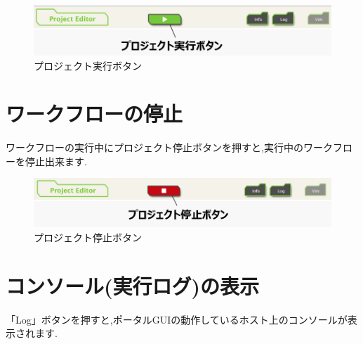 \documentclass[a4paper,10pt,oneside]{jsbook}
\begin{document}
\begin{figure}[htbp]
	\begin{center}
		\includegraphics[width=12.0cm]{image/execute_project_button.png}
	\end{center}
	\caption{プロジェクト実行ボタン}
	\label{fig:execute_project_button}
\end{figure}

\section{ワークフローの停止}
ワークフローの実行中にプロジェクト停止ボタンを押すと,実行中のワークフローを停止出来ます.

\begin{figure}[htbp]
	\begin{center}
		\includegraphics[width=12.0cm]{image/stop_project_button.png}
	\end{center}
	\caption{プロジェクト停止ボタン}
	\label{fig:stop_project_button}
\end{figure}

\section{コンソール(実行ログ)の表示}
「Log」ボタンを押すと,ポータルGUIの動作しているホスト上のコンソールが表示されます.
\end{document}
